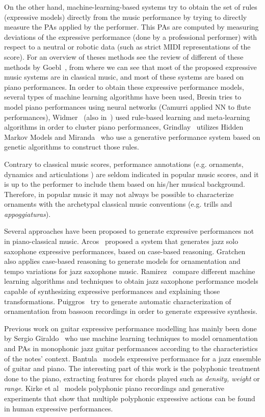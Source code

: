 On the other hand, machine-learning-based systems try to obtain the set of rules (expressive models) directly from the music performance by trying to directly measure the PAs applied by the performer. This PAs are computed by measuring deviations of the expressive performance (done by a professional performer) with respect to a neutral or robotic data (such as strict MIDI representations of the score). For an overview of theses methods see the review of different of these methods by Goebl~\cite{Goebl2005}, from where we can see that most of the proposed expressive music systems are in classical music, and most of these systems are based on piano performances. In order to obtain these expressive performance models, several types of machine learning algorithms have been used, Bresin\cite{Bresin1998} tries to model piano performances using neural networks (Camurri\cite{Camurri2000} applied NN to flute performances), Widmer~\cite{Widmer2003a} (also in~\cite{Widmer2003}) used rule-based learning and meta-learning algorithms in order to cluster piano performances, Grindlay~\cite{Grindlay2006} utilizes Hidden Markov Models and Miranda~\cite{Miranda2010} who use a generative performance system based on genetic algorithms to construct those rules. 

Contrary to classical music scores, performance annotations (e.g. ornaments, dynamics and articulations ) are seldom indicated in popular music scores, and it is up to the performer to include them based on his/her musical background. Therefore, in popular music it may not always be possible to characterize ornaments with the archetypal classical music conventions (e.g. trills and \textit{appoggiaturas}). 

Several approaches have been proposed to generate expressive performances not in piano-classical music. Arcos~\cite{Arcos1998} proposed a system that generates jazz solo saxophone expressive performances, based on case-based reasoning. Gratchen~\cite{Grachten2006} also applies case-based reasoning to generate models for ornamentation and tempo variations for jazz saxophone music. Ramirez~\cite{Ramirez2006} compare different machine learning algorithms and techniques to obtain jazz saxophone performance models capable of synthesizing expressive performances and explaining those transformations. Puiggros~\cite{Puiggros2006} try to generate automatic characterization of ornamentation from bassoon recordings in order to generate expressive synthesis.

Previous work on guitar expressive performance modelling has mainly been done by Sergio Giraldo~\cite{Giraldo2016} who use machine learning techniques to model ornamentation and PAs in monophonic jazz guitar performances according to the characteristics of the notes' context.
Bantula~\cite{bantula2016} models expressive performance for a jazz ensemble of guitar and piano. The interesting part of this work is the polyphonic treatment done to the piano, extracting features for chords played such as \textit{density, weight} or \textit{range}. Kirke et al~\cite{KirkeAlexisMiranda2013} models polyphonic piano recordings and generative experiments that show that multiple polyphonic expressive actions can be found in human expressive performances. 


